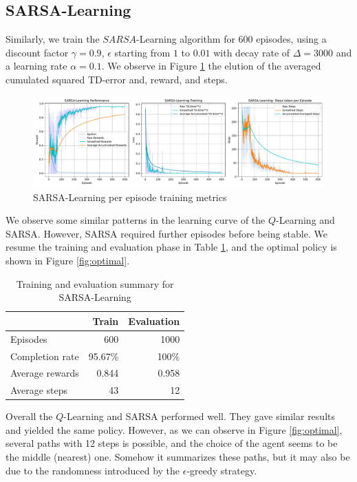 \subsection{SARSA-Learning}
Similarly, we train the $SARSA$-Learning algorithm for $600$ episodes, using a discount factor $\gamma=0.9$, $\epsilon$ starting from $1$ to $0.01$ with decay rate of $\Delta=3000$ and a learning rate $\alpha=0.1$. We observe in Figure \ref{fig:sarsalog} the elution of the averaged cumulated squared TD-error and, reward, and steps.
\begin{figure}[H]
	\centering
	\includegraphics[width=\linewidth]{figures/SARSALearning_episode.pdf}
	\caption{SARSA-Learning per episode training metrics}
	\label{fig:sarsalog}
\end{figure}
We observe some similar patterns in the learning curve of the $Q$-Learning and SARSA. However, SARSA required further episodes before being stable.  We resume the training and evaluation phase in Table \ref{tab:sarsa}, and the optimal policy is shown in Figure \ref{fig:optimal}.
\begin{table}
	\centering
	\begin{tabular}{@{}lrr@{}}
		\cmidrule(l){2-3}
		& Train & Evaluation \\ \midrule
		Episodes        &  600      &  1000          \\
		Completion rate &   95.67\%    &  100\%           \\
		Average rewards &   0.844    &    0.958        \\
		Average steps   &    43   &     12       \\ \bottomrule
	\end{tabular}
	\caption{Training and evaluation summary for {SARSA-Learning}}
	\label{tab:sarsa}
\end{table}

Overall the $Q$-Learning and SARSA performed well. They gave similar results and yielded the same policy. However, as we can observe in Figure \ref{fig:optimal}, several paths with 12 steps is possible, and the choice of the agent seems to be the middle (nearest) one. Somehow it summarizes these paths, but it may also be due to the randomness introduced by the $\epsilon$-greedy strategy.




